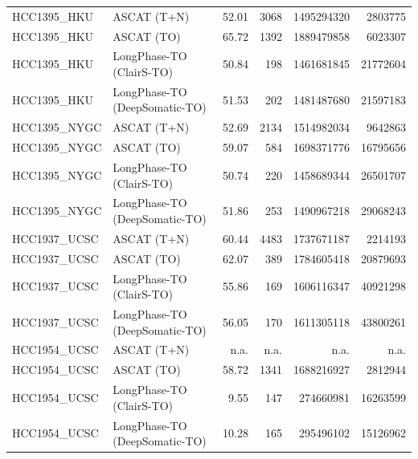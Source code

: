\documentclass[pdflatex,sn-nature]{sn-jnl}
\begin{document}
\begin{table}[htbp]
\begin{tabular}{@{}llrrrr@{}}
    HCC1395\_HKU   & ASCAT (T+N)                  & 52.01 & 3068 & 1495294320 &  2803775  \\
    HCC1395\_HKU   & ASCAT (TO)                   & 65.72 & 1392 & 1889479858 &  6023307  \\
    HCC1395\_HKU   & LongPhase-TO (ClairS-TO)      & 50.84 & 198  & 1461681845 & 21772604  \\
    HCC1395\_HKU   & LongPhase-TO (DeepSomatic-TO) & 51.53 & 202  & 1481487680 & 21597183  \\
    HCC1395\_NYGC  & ASCAT (T+N)                  & 52.69 & 2134 & 1514982034 &  9642863  \\
    HCC1395\_NYGC  & ASCAT (TO)                   & 59.07 & 584  & 1698371776 & 16795656  \\
    HCC1395\_NYGC  & LongPhase-TO (ClairS-TO)      & 50.74 & 220  & 1458689344 & 26501707  \\
    HCC1395\_NYGC  & LongPhase-TO (DeepSomatic-TO) & 51.86 & 253  & 1490967218 & 29068243  \\
    HCC1937\_UCSC  & ASCAT (T+N)                  & 60.44 & 4483 & 1737671187 &  2214193  \\
    HCC1937\_UCSC  & ASCAT (TO)                   & 62.07 & 389  & 1784605418 & 20879693  \\
    HCC1937\_UCSC  & LongPhase-TO (ClairS-TO)      & 55.86 & 169  & 1606116347 & 40921298  \\
    HCC1937\_UCSC  & LongPhase-TO (DeepSomatic-TO) & 56.05 & 170  & 1611305118 & 43800261  \\
    HCC1954\_UCSC  & ASCAT (T+N)                  & n.a. & n.a. & n.a. & n.a. \\
    HCC1954\_UCSC  & ASCAT (TO)                   & 58.72 & 1341 & 1688216927 &  2812944  \\
    HCC1954\_UCSC  & LongPhase-TO (ClairS-TO)      & 9.55 & 147  &  274660981 & 16263599  \\
    HCC1954\_UCSC  & LongPhase-TO (DeepSomatic-TO) & 10.28 & 165  &  295496102 & 15126962  \\
    \bottomrule
  \end{tabular}
\end{table}
\end{document}
